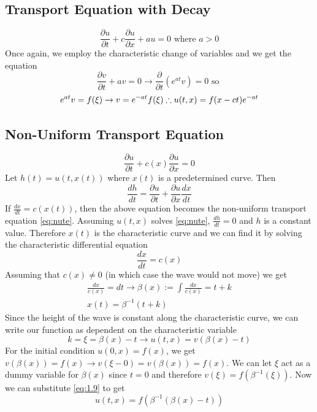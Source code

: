 \documentclass{article}
\newcommand{\pd}[2]{\frac{\partial #1}{\partial #2}}
\newcommand{\od}[2]{\frac{d #1}{d #2}}
\numberwithin{equation}{section}
\begin{document}
\subsection{Transport Equation with Decay}
\begin{equation}
    \pd{u}{t} + c \pd{u}{x} + au = 0 \hspace{4pt} \text{where } a>0
\end{equation}
Once again, we employ the characteristic change of variables and we get the equation 
\begin{equation}
    \pd{v}{t} + av = 0 \rightarrow \frac{\partial}{\partial t}(e^{at}v) = 0 \text{ so }
\end{equation}
\begin{equation*}
     \newline
    e^{at}v = f(\xi) \rightarrow v = e^{-at}f(\xi) \therefore u(t,x) = f(x-ct)e^{-at}
\end{equation*}

\subsection{Non-Uniform Transport Equation}
\begin{equation}
    \pd{u}{t} + c(x)\pd{u}{x} = 0 \label{eq:nute}
\end{equation}
Let $h(t) = u(t,x(t))$ where $x(t)$ is a predetermined curve. Then 
\begin{equation*}
    \od{h}{t} = \pd{u}{t} + \pd{u}{x}\od{x}{t}
\end{equation*}
If $\od{x}{t} = c(x(t))$, then the above equation becomes the non-uniform transport equation \eqref{eq:nute}. Assuming $u(t,x)$ solves \eqref{eq:nute}, $\od{h}{t} = 0$ and $h$ is a constant value. Therefore $x(t)$ is the characteristic curve and we can find it by solving the characteristic differential equation 
\begin{equation}
    \od{x}{t} = c(x) \label{eq:1.7}
\end{equation}
Assuming that $c(x) \neq 0 $ (in which case the wave would not move) we get 
\begin{equation}
\begin{split}
    \frac{dx}{c(x)} = dt \rightarrow \beta(x) := \int\frac{dx}{c(x)} = t+ k \label{eq:1.8} \\
    x(t) = \beta^{-1} (t+k)
\end{split}
\end{equation}
Since the height of the wave is constant along the characteristic curve, we can write our function as dependent on the characteristic variable
\begin{equation}
    k=\xi=\beta(x)-t \rightarrow u(t,x) = v(\beta(x)-t)\label{eq:1.9}
\end{equation}
For the initial condition $u(0,x) = f(x)$, we get $v(\beta(x)) = f(x) \rightarrow v(\xi-0)=v(\beta(x)) = f(x)$. We can let $\xi$ act as a dummy variable for $\beta(x)$ since $t=0$ and therefore $v(\xi) = f(\beta^{-1}(\xi))$. Now we can substitute \eqref{eq:1.9} to get
\begin{equation}
    u(t,x)=f(\beta^{-1}(\beta(x)-t)) \label{eq:1.10}
\end{equation}
\end{document}
